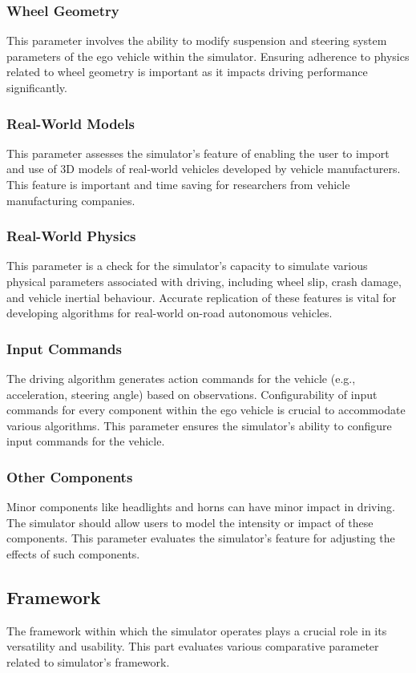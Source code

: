 \documentclass[12pt,twoside,a4paper,parskip]{scrbook} %
\begin{document}
\subsubsection{Wheel Geometry}
This parameter involves the ability to modify suspension and steering system parameters of the ego vehicle within the simulator. Ensuring adherence to physics related to wheel geometry is important as it impacts driving performance significantly.

\subsubsection{Real-World Models}
This parameter assesses the simulator's feature of enabling the user to import and use of 3D models of real-world vehicles developed by vehicle manufacturers. This feature is important and time saving for researchers from vehicle manufacturing companies.

\subsubsection{Real-World Physics}
This parameter is a check for the simulator's capacity to simulate various physical parameters associated with driving, including wheel slip, crash damage, and vehicle inertial behaviour. Accurate replication of these features is vital for developing algorithms for real-world on-road autonomous vehicles.

\subsubsection{Input Commands}
The driving algorithm generates action commands for the vehicle (e.g., acceleration, steering angle) based on observations. Configurability of input commands for every component within the ego vehicle is crucial to accommodate various algorithms. This parameter ensures the simulator's ability to configure input commands for the vehicle.

\subsubsection{Other Components}
Minor components like headlights and horns can have minor impact in driving. The simulator should allow users to model the intensity or impact of these components. This parameter evaluates the simulator's feature for adjusting the effects of such components.

\subsection{Framework}
The framework within which the simulator operates plays a crucial role in its versatility and usability. This part evaluates various comparative parameter related to simulator’s framework.
\end{document}
